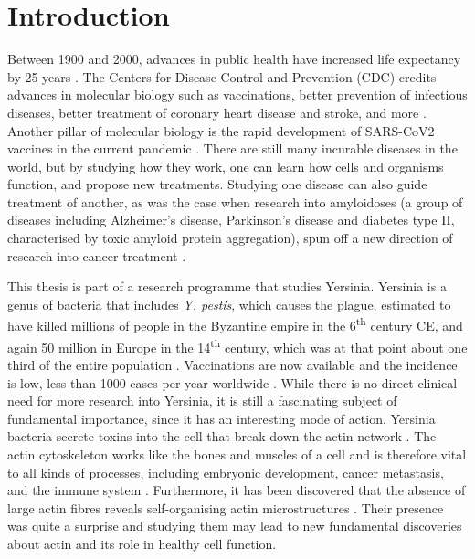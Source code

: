 \chapter{Introduction}
Between 1900 and 2000, advances in public health have increased life expectancy by 25 years \cite{Bunker1994}. The Centers for Disease Control and Prevention (CDC) credits advances in molecular biology such as vaccinations, better prevention of infectious diseases, better treatment of coronary heart disease and stroke, and more \cite{CDC1999}. Another pillar of molecular biology is the rapid development of SARS-CoV2 vaccines in the current pandemic \cite{Sadoff2021, Polack2020}. There are still many incurable diseases in the world, but by studying how they work, one can learn how cells and organisms function, and propose new treatments. Studying one disease can also guide treatment of another, as was the case when research into amyloidoses (a group of diseases including Alzheimer's disease, Parkinson's disease and diabetes type II, characterised by toxic amyloid protein aggregation), spun off a new direction of research into cancer treatment \cite{Gallardo2016}.

This thesis is part of a research programme that studies Yersinia. Yersinia is a genus of bacteria that includes \emph{Y. pestis}, which causes the plague, estimated to have killed millions of people in the Byzantine empire in the 6\textsuperscript{th} century CE, and again 50 million in Europe in the 14\textsuperscript{th} century, which was at that point about one third of the entire population \cite{Zietz2004}. Vaccinations are now available and the incidence is low, less than 1000 cases per year worldwide \cite{WHO2014}. 
While there is no direct clinical need for more research into Yersinia, it is still a fascinating subject of fundamental importance, since it has an interesting mode of action. Yersinia bacteria secrete toxins into the cell that break down the actin network \cite{Ono2017}. The actin cytoskeleton works like the bones and muscles of a cell and is therefore vital to all kinds of processes, including embryonic development, cancer metastasis, and the immune system \cite{molbio, Horwitz2003, Umeda2016, Barnat2017, Lin2017}. Furthermore, it has been discovered that the absence of large actin fibres reveals self-organising actin microstructures \cite{Fritzsche2017a}. Their presence was quite a surprise and studying them may lead to new fundamental discoveries about actin and its role in healthy cell function.

